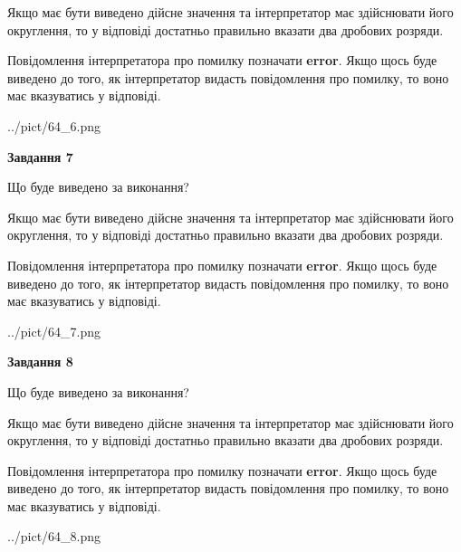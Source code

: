 \documentclass[12pt, ukrainian]{article}
\begin{document}
{\begin {Large}
Якщо має бути виведено дійсне значення та інтерпретатор має здійснювати його округлення, 
то у відповіді достатньо правильно вказати два дробових розряди.

Повідомлення інтерпретатора про помилку позначати \textbf{error}.
Якщо щось буде виведено до того, як інтерпретатор видасть повідомлення про помилку, 
то воно має вказуватись у відповіді. \par

\begin{center}
	{../pict/64_6.png}
\end{center}
\newpage

{\begin {center}\textbf{Завдання 7}\end {center}}\par
Що буде виведено за виконання? \par

Якщо має бути виведено дійсне значення та інтерпретатор має здійснювати його округлення, 
то у відповіді достатньо правильно вказати два дробових розряди.

Повідомлення інтерпретатора про помилку позначати \textbf{error}.
Якщо щось буде виведено до того, як інтерпретатор видасть повідомлення про помилку, 
то воно має вказуватись у відповіді. \par

\begin{center}
	{../pict/64_7.png}
\end{center}
\newpage

{\begin {center}\textbf{Завдання 8}\end {center}}\par
Що буде виведено за виконання? \par

Якщо має бути виведено дійсне значення та інтерпретатор має здійснювати його округлення, 
то у відповіді достатньо правильно вказати два дробових розряди.

Повідомлення інтерпретатора про помилку позначати \textbf{error}.
Якщо щось буде виведено до того, як інтерпретатор видасть повідомлення про помилку, 
то воно має вказуватись у відповіді. \par

\begin{center}
	{../pict/64_8.png}
\end{center}
\newpage


\end{Large}}
\end{document}
